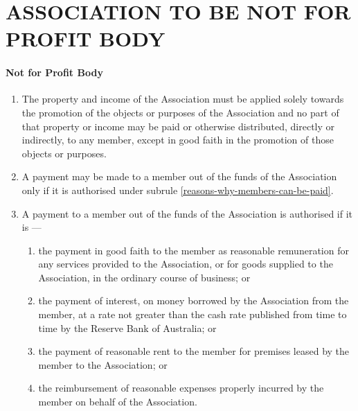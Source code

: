 \documentclass[../constitution.tex]{subfiles}
\begin{document}
\part{ASSOCIATION TO BE NOT FOR PROFIT BODY} \label{part-2-association-to-be-not-for-profit-body}


\subsection{Not for Profit Body} \label{not-for-profit-body}

\begin{enumerate}

  \item The property and income of the Association must be applied solely towards the promotion of the objects or purposes of the Association and no part of that property or income may be paid or otherwise distributed, directly or indirectly, to any member, except in good faith in the promotion of those objects or purposes.
  \item A payment may be made to a member out of the funds of the Association only if it is authorised under subrule \ref{reasons-why-members-can-be-paid}.
  \item A payment to a member out of the funds of the Association is authorised if it is ---

        \begin{enumerate} \label{reasons-why-members-can-be-paid}
          \item the payment in good faith to the member as reasonable remuneration for any services provided to the Association, or for goods supplied to the Association, in the ordinary course of business; or
          \item the payment of interest, on money borrowed by the Association from the member, at a rate not greater than the cash rate published from time to time by the Reserve Bank of Australia; or
          \item the payment of reasonable rent to the member for premises leased by the member to the Association; or
          \item the reimbursement of reasonable expenses properly incurred by the member on behalf of the Association.
        \end{enumerate}
\end{enumerate}

\end{document}
